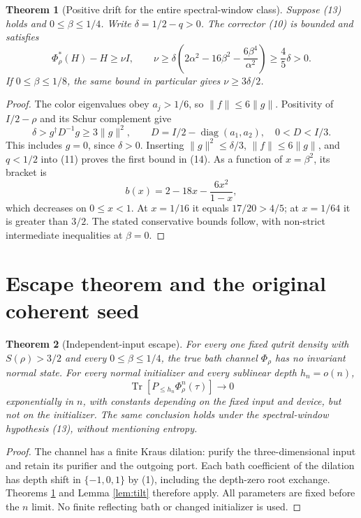\documentclass[11pt]{article}
\newtheorem{theorem}{Theorem}[section]
\newcommand{\Tr}{\operatorname{Tr}}
\begin{document}
\begin{theorem}[Positive drift for the entire spectral-window class]
\label{thm:windowdrift}
Suppose (13) holds and $0\le\beta\le1/4$. Write
$\delta=1/2-q>0$. The corrector (10) is bounded and satisfies
\[
 \Phi_\rho^*(H)-H\ge\nu I,\qquad
 \nu\ge\delta\left(2\alpha^2-16\beta^2
                    -\frac{6\beta^4}{\alpha^2}\right)
 \ge\frac45\delta>0.
 \tag{14}
\]
If $0\le\beta\le1/8$, the same bound in particular gives
$\nu\ge3\delta/2$.
\end{theorem}
\begin{proof}
The color eigenvalues obey $a_j>1/6$, so $\|f\|\le6\|g\|$.
Positivity of $I/2-\rho$ and its Schur complement give
\[
 \delta>g^\dagger D^{-1}g\ge3\|g\|^2,\qquad
 D=I/2-\operatorname{diag}(a_1,a_2),\quad 0<D<I/3.
 \tag{15}
\]
This includes $g=0$, since $\delta>0$.
Inserting $\|g\|^2\le\delta/3$, $\|f\|\le6\|g\|$, and $q<1/2$
into (11) proves the first bound in (14). As a function of
$x=\beta^2$, its bracket is
\[
 b(x)=2-18x-\frac{6x^2}{1-x},
\]
which decreases on $0\le x<1$. At $x=1/16$ it equals $17/20>4/5$;
at $x=1/64$ it is greater than $3/2$. The stated conservative bounds
follow, with non-strict intermediate inequalities at $\beta=0$.
\end{proof}



\section{Escape theorem and the original coherent seed}

\begin{theorem}[Independent-input escape]\label{thm:escape}
For every one fixed qutrit density with $S(\rho)>3/2$ and every
$0\le\beta\le1/4$, the true bath channel $\Phi_\rho$ has no invariant
normal state. For every normal initializer and every sublinear depth
$h_n=o(n)$,
\[
 \Tr[P_{\le h_n}\Phi_\rho^n(\tau)]\longrightarrow0
\]
exponentially in $n$, with constants depending on the fixed input and
device, but not on the initializer. The same conclusion holds under
the spectral-window hypothesis (13), without mentioning entropy.
\end{theorem}
\begin{proof}
The channel has a finite Kraus dilation: purify the three-dimensional
input and retain its purifier and the outgoing port. Each bath coefficient
of the dilation has depth shift in $\{-1,0,1\}$ by (1), including the
depth-zero root exchange. Theorems \ref{thm:windowdrift} and
Lemma \ref{lem:tilt} therefore apply. All parameters are fixed before the
$n$ limit. No finite reflecting bath or changed initializer is used.
\end{proof}
\end{document}
